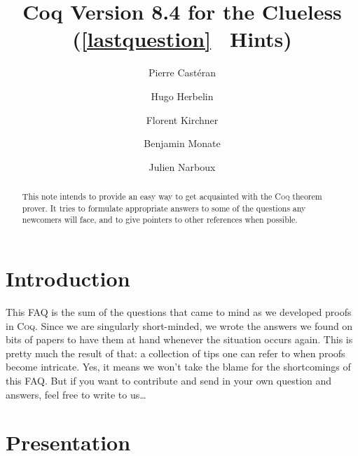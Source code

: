 \documentclass[a4paper,pdftex]{article}
\def\Coq{\textsc{Coq}}
\begin{document}

\renewcommand{\thesubsubsection}{\arabic{question}}


\title{Coq Version 8.4 for the Clueless\\
  \large(\protect\ref{lastquestion}
  \ Hints)
}
\author{Pierre Castéran \and Hugo Herbelin \and Florent Kirchner \and Benjamin Monate \and Julien Narboux}
\maketitle


\begin{abstract}
This note intends to provide an easy way to get acquainted with the
{\Coq} theorem prover. It tries to formulate appropriate answers
to some of the questions any newcomers will face, and to give
pointers to other references when possible.
\end{abstract}


\tableofcontents


\newpage

\section{Introduction}
This FAQ is the sum of the questions that came to mind as we developed
proofs in \Coq. Since we are singularly short-minded, we wrote the
answers we found on bits of papers to have them at hand whenever the
situation occurs again. This is pretty much the result of that: a
collection of tips one can refer to when proofs become intricate. Yes,
it means we won't take the blame for the shortcomings of this
FAQ. But if you want to contribute and send in your own question and
answers, feel free to write to us\ldots


\section{Presentation}
\end{document}
